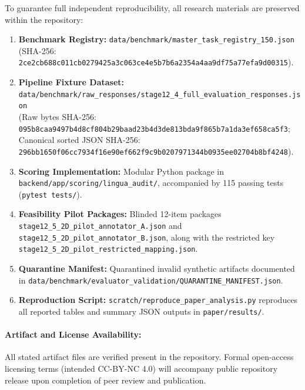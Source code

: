 \documentclass[11pt,a4paper]{article}
\begin{document}
To guarantee full independent reproducibility, all research materials are preserved within the repository:
\begin{enumerate}
  \item \textbf{Benchmark Registry:} \texttt{data/benchmark/master\_task\_registry\_150.json} \\ (SHA-256: \texttt{2ce2cb688c011cb0279425a3c063ce4e5b7b6a2354a4aa9df75a77efa9d00315}).
  \item \textbf{Pipeline Fixture Dataset:} \texttt{data/benchmark/raw\_responses/stage12\_4\_full\_evaluation\_responses.json} \\ (Raw bytes SHA-256: \texttt{095b8caa9497b4d8cf804b29baad23b4d3de813bda9f865b7a1da3ef658ca5f3}; \\ Canonical sorted JSON SHA-256: \texttt{296bb1650f06cc7934f16e90ef662f9c9b0207971344b0935ee02704b8bf4248}).
  \item \textbf{Scoring Implementation:} Modular Python package in \texttt{backend/app/scoring/lingua\_audit/}, accompanied by 115 passing tests (\texttt{pytest tests/}).
  \item \textbf{Feasibility Pilot Packages:} Blinded 12-item packages \texttt{stage12\_5\_2D\_pilot\_annotator\_A.json} and \texttt{stage12\_5\_2D\_pilot\_annotator\_B.json}, along with the restricted key \texttt{stage12\_5\_2D\_pilot\_restricted\_mapping.json}.
  \item \textbf{Quarantine Manifest:} Quarantined invalid synthetic artifacts documented in \texttt{data/benchmark/evaluator\_validation/QUARANTINE\_MANIFEST.json}.
  \item \textbf{Reproduction Script:} \texttt{scratch/reproduce\_paper\_analysis.py} reproduces all reported tables and summary JSON outputs in \texttt{paper/results/}.
\end{enumerate}

\paragraph{Artifact and License Availability:} All stated artifact files are verified present in the repository. Formal open-access licensing terms (intended CC-BY-NC 4.0) will accompany public repository release upon completion of peer review and publication.



\end{document}
